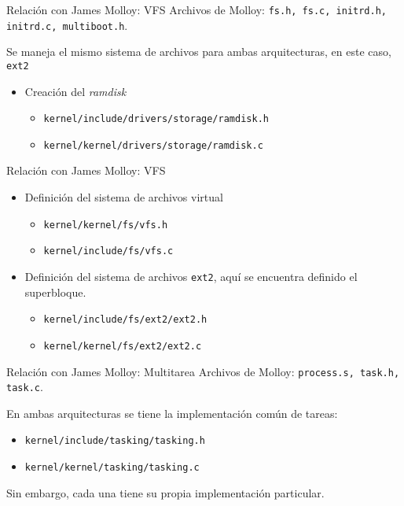 \begin{frame}{Relación con James Molloy: VFS}
	Archivos de Molloy: \texttt{fs.h, fs.c, initrd.h, initrd.c, multiboot.h}.
	
	Se maneja el mismo sistema de archivos para ambas arquitecturas, en este caso, \texttt{ext2}
	\begin{itemize} \setlength\itemsep{0pt}\footnotesize
		\item Creación del \textit{ramdisk}
		\begin{itemize} \setlength\itemsep{0pt}
			\item \texttt{kernel/include/drivers/storage/ramdisk.h}
			\item \texttt{kernel/kernel/drivers/storage/ramdisk.c}
		\end{itemize}
	\end{itemize}
\end{frame}

\begin{frame}{Relación con James Molloy: VFS}
	\begin{itemize} \setlength\itemsep{0pt}\footnotesize
		\item Definición del sistema de archivos virtual
		\begin{itemize} \setlength\itemsep{0pt}
			\item \texttt{kernel/kernel/fs/vfs.h}
			\item \texttt{kernel/include/fs/vfs.c}
		\end{itemize}
	
		\item Definición del sistema de archivos \texttt{ext2}, aquí se encuentra definido el superbloque.
		\begin{itemize} \setlength\itemsep{0pt}
			\item \texttt{kernel/include/fs/ext2/ext2.h}
			\item \texttt{kernel/kernel/fs/ext2/ext2.c}
		\end{itemize}
	\end{itemize}
\end{frame}


\begin{frame}{Relación con James Molloy: Multitarea}
	Archivos de Molloy: \texttt{process.s, task.h, task.c}.
	
	En ambas arquitecturas se tiene la implementación común de tareas:
	\begin{itemize} \setlength\itemsep{0pt}
		\item \texttt{kernel/include/tasking/tasking.h}
		\item \texttt{kernel/kernel/tasking/tasking.c}
	\end{itemize}
	
	Sin embargo, cada una tiene su propia implementación particular.
\end{frame}

